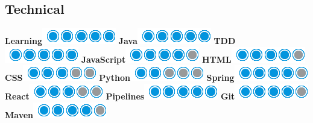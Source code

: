 \documentclass[]{friggeri-cv}
\begin{document}
\begin{aside}
  \section{Technical}
  \hspace{1cm}
    \textbf{Learning}\includegraphics[scale=0.40]{img/5puces.png}
    \textbf{Java}\includegraphics[scale=0.40]{img/5puces.png}
    \textbf{TDD}\includegraphics[scale=0.40]{img/5puces.png}
    \textbf{JavaScript}\includegraphics[scale=0.40]{img/4puces.png}
    \textbf{HTML}\includegraphics[scale=0.40]{img/4puces.png}
    \textbf{CSS}\includegraphics[scale=0.40]{img/3puces.png}
    \textbf{Python}\includegraphics[scale=0.40]{img/2puces.png}
    \textbf{Spring}\includegraphics[scale=0.40]{img/4puces.png}
    \textbf{React}\includegraphics[scale=0.40]{img/3puces.png}
    \textbf{Pipelines}\includegraphics[scale=0.40]{img/5puces.png}
    \textbf{Git}\includegraphics[scale=0.40]{img/4puces.png}
    \textbf{Maven}\includegraphics[scale=0.40]{img/4puces.png}

\end{aside}
\end{document}
